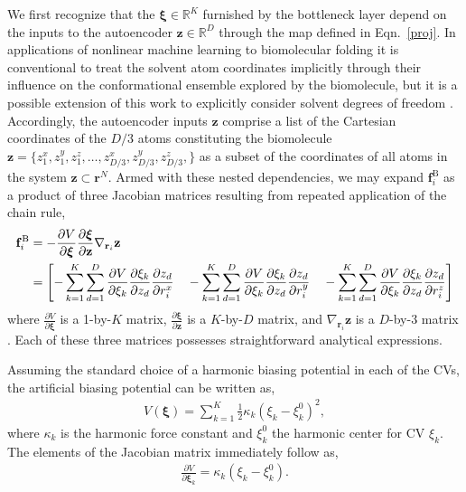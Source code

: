 \documentclass[12pt]{article}
\newcommand*{\blauw}[1]{#1}
\begin{document}
We first recognize that the $\boldsymbol\xi \in \mathbb{R}^K$ furnished by the bottleneck layer depend on the inputs to the autoencoder $\mathbf{z} \in \mathbb{R}^D$ through the map defined in \blauw{Eqn.~\ref{proj}}. In applications of nonlinear machine learning to biomolecular folding it is conventional to treat the solvent atom coordinates implicitly through their influence on the conformational ensemble explored by the biomolecule, but it is a possible extension of this work to explicitly consider solvent degrees of freedom \cite{ferguson2011nonlinear}. Accordingly, the autoencoder inputs $\mathbf{z}$ comprise a list of the Cartesian coordinates of the $D/3$ atoms constituting the biomolecule $\mathbf{z} = \{z_1^x, z_1^y, z_1^z, \ldots, z_{D/3}^x, z_{D/3}^y, z_{D/3}^z,\}$ as a subset of the coordinates of all atoms in the system $\mathbf{z} \subset \mathbf{r}^N$. Armed with these nested dependencies, we may expand $\mathbf{f}_i^\mathrm{B}$ as a product of three Jacobian matrices resulting from repeated application of the chain rule,
\begin{align} \label{fiB}
\mathbf{f}_i^\mathrm{B} &= - \frac{\partial V}{\partial \boldsymbol\xi} \frac{\partial \boldsymbol\xi}{\partial \mathbf{z}} \nabla_{\mathbf{r}_i} \mathbf{z} \notag \\
&= \left[ -\sum_{k=1}^K \sum_{d=1}^D \frac{\partial V}{\partial \xi_k} \frac{\partial \xi_k}{\partial z_d} \frac{\partial z_d}{\partial r_i^x} \quad -\sum_{k=1}^K \sum_{d=1}^D \frac{\partial V}{\partial \xi_k} \frac{\partial \xi_k}{\partial z_d} \frac{\partial z_d}{\partial r_i^y} \quad -\sum_{k=1}^K \sum_{d=1}^D \frac{\partial V}{\partial \xi_k} \frac{\partial \xi_k}{\partial z_d} \frac{\partial z_d}{\partial r_i^z}\right]
\end{align}
where $\frac{\partial V}{\partial \boldsymbol\xi}$ is a 1-by-$K$ matrix, $\frac{\partial \boldsymbol\xi}{\partial \mathbf{z}}$ is a $K$-by-$D$ matrix, and $\nabla_{\mathbf{r}_i} \mathbf{z}$ is a $D$-by-3 matrix \cite{hashemian2013modeling}. Each of these three matrices possesses straightforward analytical expressions.

 Assuming the standard choice of a harmonic biasing potential in each of the CVs, the artificial biasing potential can be written as,
\begin{align} \label{potential_fun}
V(\boldsymbol\xi) = \sum_{k=1}^K \frac{1}{2} \kappa_k \left( \xi_k - \xi_k^0 \right)^2,
\end{align}
where $\kappa_k$ is the harmonic force constant and $\xi_k^0$ the harmonic center for CV $\xi_k$. The elements of the Jacobian matrix immediately follow as,
\begin{align} \label{dVdxi}
\frac{\partial V}{\partial \boldsymbol\xi_k} = \kappa_k \left( \xi_k - \xi_k^0 \right).
\end{align}
\end{document}
